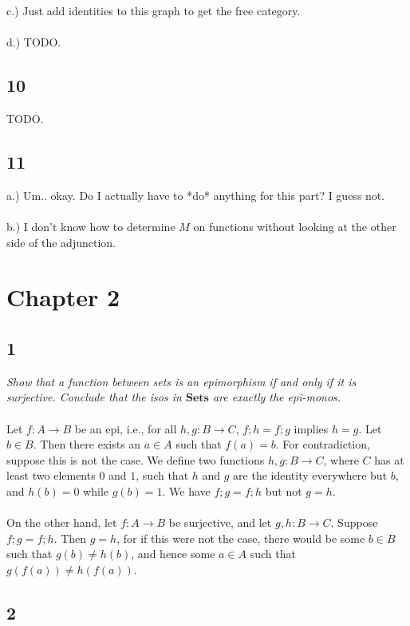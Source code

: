 \documentclass{article}
\newcommand{\mbf}{\mathbf}
\begin{document}
c.) Just add identities to this graph to get the free category.\\~\\

d.) TODO.

\subsection{10} TODO.

\subsection{11}
a.) Um.. okay. Do I actually have to *do* anything for this part? I guess not.
\\~\\
b.) I don't know how to determine $M$ on functions without looking at the other side of the adjunction.

\section{Chapter 2}

\subsection{1}

\emph{Show that a function between sets is an epimorphism if and only if it is surjective. Conclude that the isos in 
 $\mbf{Sets}$ are exactly the epi-monos.}\\~\\
Let $f : A \to B$ be an epi, i.e., for all $h,g : B \to C$, $f;h = f;g$ implies $h=g$.
Let $b \in B$. Then there exists an $a \in A$ such that $f(a) = b$. For contradiction, suppose this is not the case.
We define two functions $h,g : B \to C$, where $C$ has at least two elements $0$ and $1$, such that $h$ and $g$
are the identity everywhere but $b$, and $h(b) = 0$ while $g(b) = 1$. We have $f;g = f;h$ but not $g=h$.
\\~\\
On the other hand, let $f : A \to B$ be surjective, and let $g,h : B \to C$.
Suppose $f;g = f;h$. Then $g = h$, for if this were not the case, there would be some $b \in B$ such that
$g(b) \neq h(b)$, and hence some $a \in A$ such that $g(f(a)) \neq h(f(a))$.

\subsection{2}
\end{document}
